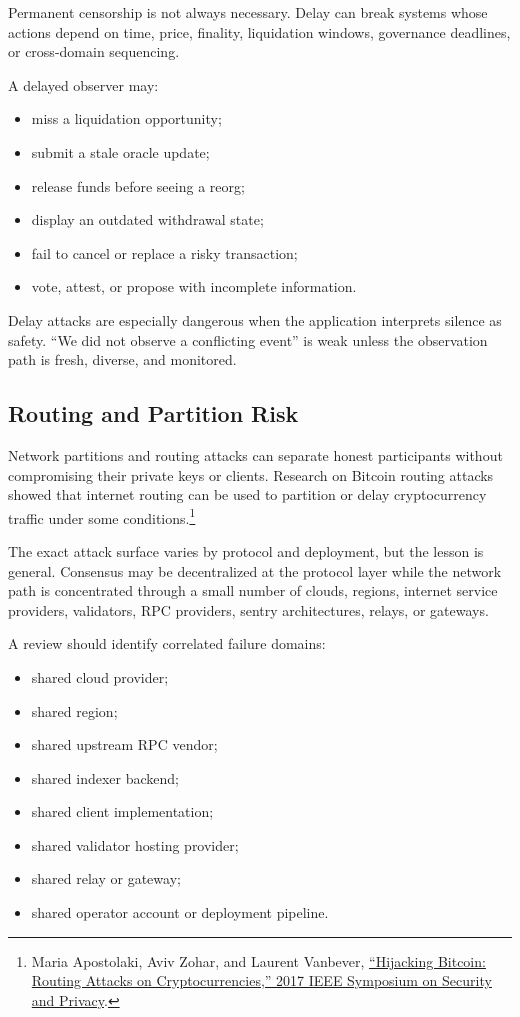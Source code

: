 Permanent censorship is not always necessary. Delay can break systems whose actions depend on time, price, finality, liquidation windows, governance deadlines, or cross-domain sequencing.

A delayed observer may:

\begin{itemize}
\item miss a liquidation opportunity;
\item submit a stale oracle update;
\item release funds before seeing a reorg;
\item display an outdated withdrawal state;
\item fail to cancel or replace a risky transaction;
\item vote, attest, or propose with incomplete information.
\end{itemize}

Delay attacks are especially dangerous when the application interprets silence as safety. ``We did not observe a conflicting event'' is weak unless the observation path is fresh, diverse, and monitored.

\subsection{Routing and Partition Risk}

Network partitions and routing attacks can separate honest participants without compromising their private keys or clients. Research on Bitcoin routing attacks showed that internet routing can be used to partition or delay cryptocurrency traffic under some conditions.\footnote{Maria Apostolaki, Aviv Zohar, and Laurent Vanbever, \href{https://arxiv.org/abs/1605.07524}{``Hijacking Bitcoin: Routing Attacks on Cryptocurrencies,'' 2017 IEEE Symposium on Security and Privacy}.}

The exact attack surface varies by protocol and deployment, but the lesson is general. Consensus may be decentralized at the protocol layer while the network path is concentrated through a small number of clouds, regions, internet service providers, validators, RPC providers, sentry architectures, relays, or gateways.

A review should identify correlated failure domains:

\begin{itemize}
\item shared cloud provider;
\item shared region;
\item shared upstream RPC vendor;
\item shared indexer backend;
\item shared client implementation;
\item shared validator hosting provider;
\item shared relay or gateway;
\item shared operator account or deployment pipeline.
\end{itemize}

